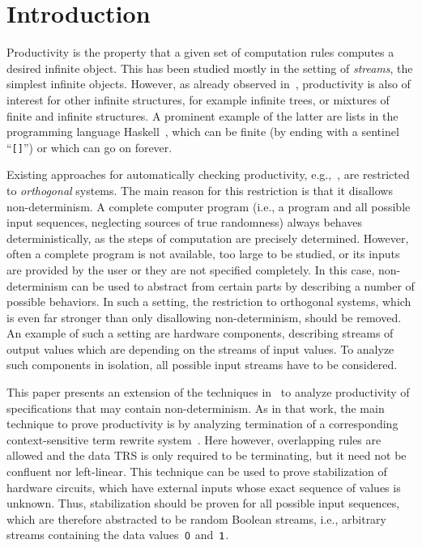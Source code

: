 \documentclass{eptcs}
\begin{document}
\section{Introduction}
\label{sec:Introduction}

Productivity is the property that a given set of computation rules computes a
desired infinite object. This has been studied mostly in the setting of
\emph{streams}, the simplest infinite objects. However, as already observed
in~\cite{ZR10}, productivity is also of interest for other infinite structures,
for example infinite trees, or mixtures of finite and infinite structures.
A prominent example of the latter are lists in the programming language
\textsf{Haskell}~\cite{Haskell98}, which can be finite (by ending with a
sentinel ``\texttt{[]}'') or which can go on forever.

Existing approaches for automatically checking productivity,
e.g.,~\cite{End10,EGH08,ZR10},
are restricted to \emph{orthogonal} systems. The main reason for this
restriction is that it disallows non-determinism. A complete computer program
(i.e., a program and all possible input sequences, neglecting sources of true
randomness) always behaves deterministically, as the steps of computation are
precisely determined.
However, often a complete program is not available, too large to be studied, or
its inputs are provided by the user or they are not specified completely.
In this case, non-determinism can be used to abstract from certain parts by
describing a number of possible behaviors. In such a setting, the restriction to
orthogonal systems, which is even far stronger than only disallowing
non-determinism, should be removed.
An example of such a setting are hardware components, describing streams of
output values which are depending on the streams of input values. To analyze
such components in isolation, all possible input streams have to be considered.

This paper presents an extension of the techniques in~\cite{ZR10} to analyze
productivity of specifications that may contain non-determinism.
As in that work, the main technique to prove productivity is by analyzing
termination of a corresponding context-sensitive term rewrite system~\cite{L98}.
Here however, overlapping rules are allowed and the data TRS is only required to
be terminating, but it need not be confluent nor left-linear.
This technique can be used to prove stabilization of hardware circuits,
which have external inputs whose exact sequence of values is unknown.
Thus, stabilization should be proven for all possible input sequences, which are
therefore abstracted to be random Boolean streams, i.e., arbitrary streams
containing the data values~$\mathsf{0}$ and~$\mathsf{1}$.
\end{document}
